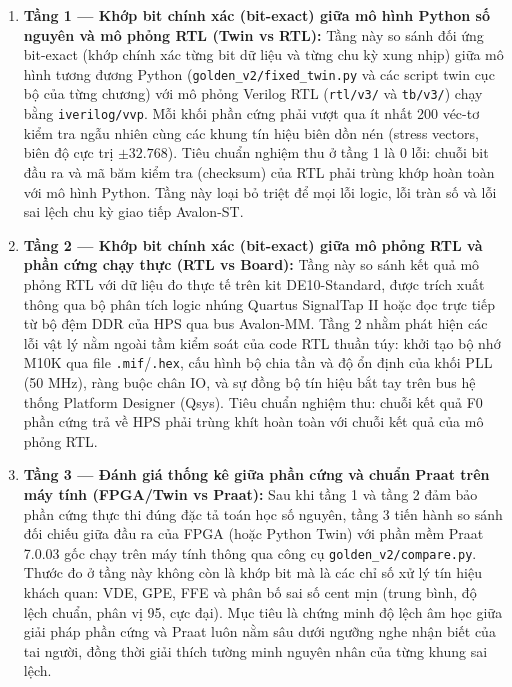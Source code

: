 \begin{enumerate}[leftmargin=1.5em, itemsep=4pt]
    \item \textbf{Tầng 1 --- Khớp bit chính xác (bit-exact) giữa mô hình Python số nguyên và mô phỏng RTL (Twin vs RTL):}
    Tầng này so sánh đối ứng bit-exact (khớp chính xác từng bit dữ liệu và từng chu kỳ xung nhịp) giữa mô hình tương đương Python (\texttt{golden\_v2/fixed\_twin.py} và các script twin cục bộ của từng chương) với mô phỏng Verilog RTL (\texttt{rtl/v3/} và \texttt{tb/v3/}) chạy bằng \texttt{iverilog/vvp}. 
    Mỗi khối phần cứng phải vượt qua ít nhất 200 véc-tơ kiểm tra ngẫu nhiên cùng các khung tín hiệu biên dồn nén (stress vectors, biên độ cực trị $\pm 32.768$). Tiêu chuẩn nghiệm thu ở tầng 1 là 0 lỗi: chuỗi bit đầu ra và mã băm kiểm tra (checksum) của RTL phải trùng khớp hoàn toàn với mô hình Python. Tầng này loại bỏ triệt để mọi lỗi logic, lỗi tràn số và lỗi sai lệch chu kỳ giao tiếp Avalon-ST.
    
    \item \textbf{Tầng 2 --- Khớp bit chính xác (bit-exact) giữa mô phỏng RTL và phần cứng chạy thực (RTL vs Board):}
    Tầng này so sánh kết quả mô phỏng RTL với dữ liệu đo thực tế trên kit DE10-Standard, được trích xuất thông qua bộ phân tích logic nhúng Quartus SignalTap II hoặc đọc trực tiếp từ bộ đệm DDR của HPS qua bus Avalon-MM. Tầng 2 nhằm phát hiện các lỗi vật lý nằm ngoài tầm kiểm soát của code RTL thuần túy: khởi tạo bộ nhớ M10K qua file \texttt{.mif}/\texttt{.hex}, cấu hình bộ chia tần và độ ổn định của khối PLL (50 MHz), ràng buộc chân IO, và sự đồng bộ tín hiệu bắt tay trên bus hệ thống Platform Designer (Qsys). Tiêu chuẩn nghiệm thu: chuỗi kết quả F0 phần cứng trả về HPS phải trùng khít hoàn toàn với chuỗi kết quả của mô phỏng RTL.
    
    \item \textbf{Tầng 3 --- Đánh giá thống kê giữa phần cứng và chuẩn Praat trên máy tính (FPGA/Twin vs Praat):}
    Sau khi tầng 1 và tầng 2 đảm bảo phần cứng thực thi đúng đặc tả toán học số nguyên, tầng 3 tiến hành so sánh đối chiếu giữa đầu ra của FPGA (hoặc Python Twin) với phần mềm Praat 7.0.03 gốc chạy trên máy tính thông qua công cụ \texttt{golden\_v2/compare.py}. Thước đo ở tầng này không còn là khớp bit mà là các chỉ số xử lý tín hiệu khách quan: VDE, GPE, FFE và phân bố sai số cent mịn (trung bình, độ lệch chuẩn, phân vị 95, cực đại). Mục tiêu là chứng minh độ lệch âm học giữa giải pháp phần cứng và Praat luôn nằm sâu dưới ngưỡng nghe nhận biết của tai người, đồng thời giải thích tường minh nguyên nhân của từng khung sai lệch.
\end{enumerate}


